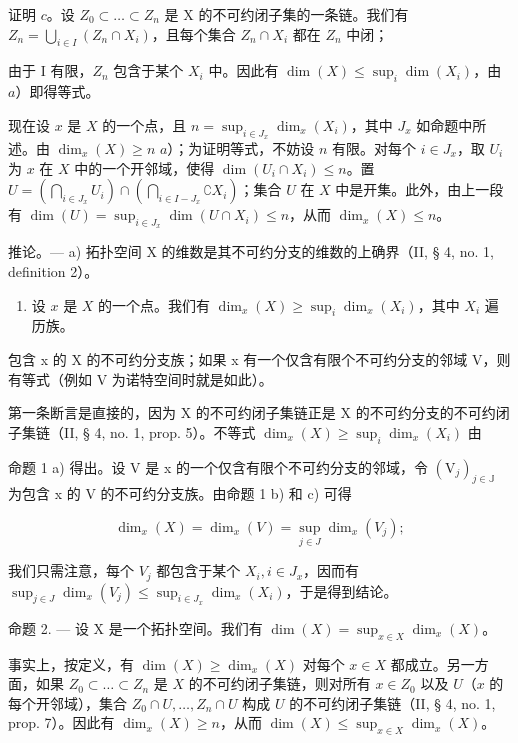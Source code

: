 证明 \(c\)。设 \(Z_{0} \subset \ldots \subset Z_{n}\) 是 X 的不可约闭子集的一条链。我们有 \(Z_{n} = \bigcup_{i \in I} (Z_{n} \cap X_{i})\)，且每个集合 \(Z_{n} \cap X_{i}\) 都在 \(Z_{n}\) 中闭；

由于 I 有限，\(Z_{n}\) 包含于某个 \(X_{i}\) 中。因此有 \(\dim(X) \leqslant \sup_{i} \dim(X_{i})\)，由 \(a\)）即得等式。

现在设 \(x\) 是 \(X\) 的一个点，且 \(n = \sup_{i \in J_x} \dim_x(X_i)\)，其中 \(J_x\) 如命题中所述。由 \(\dim_x(X) \geqslant n\) \(a\)）；为证明等式，不妨设 \(n\) 有限。对每个 \(i \in J_x\)，取 \(U_i\) 为 \(x\) 在 \(X\) 中的一个开邻域，使得 \(\dim(U_i \cap X_i) \leqslant n\)。置 \(U = (\bigcap_{i \in J_x} U_i) \cap (\bigcap_{i \in I - J_x} \complement X_i)\)；集合 \(U\) 在 \(X\) 中是开集。此外，由上一段有 \(\dim(U) = \sup_{i \in J_x} \dim(U \cap X_i) \leqslant n\)，从而 \(\dim_x(X) \leqslant n\)。

推论。--- a) 拓扑空间 X 的维数是其不可约分支的维数的上确界（II, § 4, no. 1, definition 2）。

\begin{enumerate}
\def\labelenumi{\alph{enumi})}
\setcounter{enumi}{1}
\tightlist
\item
  设 \(x\) 是 \(X\) 的一个点。我们有 \(\dim_x(X) \geqslant \sup_i \dim_x(X_i)\)，其中 \(X_i\) 遍历族。
\end{enumerate}
包含 x 的 X 的不可约分支族；如果 x 有一个仅含有限个不可约分支的邻域 V，则有等式（例如 V 为诺特空间时就是如此）。


第一条断言是直接的，因为 X 的不可约闭子集链正是 X 的不可约分支的不可约闭子集链（II, § 4, no. 1, prop. 5）。不等式 \(\dim_x(X) \geqslant \sup_i \dim_x(X_i)\) 由

命题 1 a) 得出。设 V 是 x 的一个仅含有限个不可约分支的邻域，令 \((\mathrm{V}_{j})_{j\in\mathbb{J}}\) 为包含 x 的 V 的不可约分支族。由命题 1 b) 和 c) 可得

\[
\dim_ {x} (X) = \dim_ {x} (V) = \sup _ {j \in J} \dim_ {x} (V _ {j});
\]

我们只需注意，每个 \(V_{j}\) 都包含于某个 \(X_{i}, i \in J_{x}\)，因而有 \(\sup_{j \in J} \dim_{x}(V_{j}) \leqslant \sup_{i \in J_{x}} \dim_{x}(X_{i})\)，于是得到结论。

命题 2. — 设 X 是一个拓扑空间。我们有 \(\dim(X) = \sup_{x \in X} \dim_x(X)\)。

事实上，按定义，有 \(\dim(X) \geqslant \dim_x(X)\) 对每个 \(x \in X\) 都成立。另一方面，如果 \(Z_0 \subset \ldots \subset Z_n\) 是 \(X\) 的不可约闭子集链，则对所有 \(x \in Z_0\) 以及 \(U\)（\(x\) 的每个开邻域），集合 \(Z_0 \cap U, \ldots, Z_n \cap U\) 构成 \(U\) 的不可约闭子集链（II, § 4, no. 1, prop. 7）。因此有 \(\dim_x(X) \geqslant n\)，从而 \(\dim(X) \leqslant \sup_{x \in X} \dim_x(X)\)。

